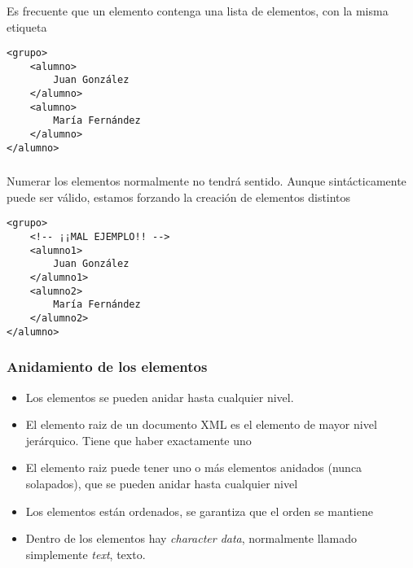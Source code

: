 \documentclass[ucs]{beamer}
\begin{document}
\begin{frame}[fragile]
\frametitle{}
Es frecuente que un elemento contenga una lista de elementos, con la misma
etiqueta

  \begin{footnotesize}
  \begin{verbatim}
<grupo>
    <alumno>
        Juan González
    </alumno>
    <alumno>
        María Fernández
    </alumno>
</alumno>
  \end{verbatim}
  \end{footnotesize}

\end{frame}
\begin{frame}[fragile]
\frametitle{}

Numerar los elementos normalmente no tendrá sentido. Aunque sintácticamente
puede ser válido, estamos forzando la creación de elementos distintos

  \begin{footnotesize}
  \begin{verbatim}
<grupo>
    <!-- ¡¡MAL EJEMPLO!! -->
    <alumno1>
        Juan González
    </alumno1>
    <alumno2>
        María Fernández
    </alumno2>
</alumno>
  \end{verbatim}
  \end{footnotesize}


\end{frame}

\begin{frame}[fragile]
\frametitle{Anidamiento de los elementos}
\begin{itemize}
\item
Los elementos se pueden anidar hasta cualquier nivel.
\item
El elemento raiz de un documento XML es el elemento de mayor nivel
jerárquico. Tiene que haber exactamente uno
\item
El elemento raiz puede tener
uno o más elementos anidados (nunca solapados), que se pueden
anidar hasta cualquier nivel
\item
Los elementos están ordenados, se garantiza que el orden se mantiene
\item
Dentro de los elementos hay \emph{character data}, normalmente
llamado simplemente \emph{text}, texto.
\end{itemize}
\end{frame}
\end{document}
